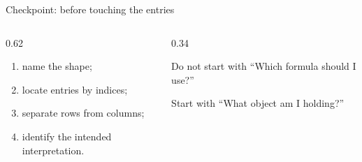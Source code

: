 \begin{frame}{Checkpoint: before touching the entries}
  \begin{columns}[T,onlytextwidth]
    \begin{column}{0.62\textwidth}
      \Large
      \begin{enumerate}
        \item name the shape;
        \item locate entries by indices;
        \item separate rows from columns;
        \item identify the intended interpretation.
      \end{enumerate}
    \end{column}
    \begin{column}{0.34\textwidth}
      \begin{alertblock}{Do not start with}
        ``Which formula should I use?''
      \end{alertblock}
      \begin{exampleblock}{Start with}
        ``What object am I holding?''
      \end{exampleblock}
    \end{column}
  \end{columns}
\end{frame}

